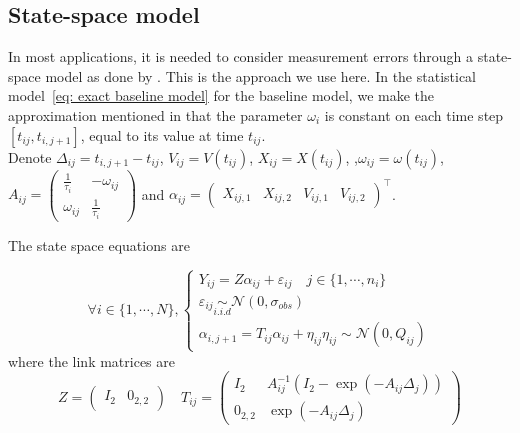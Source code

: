 \documentclass[11pt]{article}
\newcommand {\1}{\mathbb{1}}
\begin{document}
\subsection{State-space model}
\label{section: state space model}
In most applications, it is needed to consider measurement errors through a state-space model as done by \cite{johnson_continuoustime_2008}. This is the approach we use here. In the statistical model~\ref{eq: exact baseline model} for the baseline model, we make the approximation mentioned in \cite{michelot_varying-coefficient_2021} that the parameter $\omega_i$ is constant on each time step $[t_{ij},t_{i,j+1}]$, equal to its value at time $t_{ij}$.\\
 Denote $\Delta_{ij}=t_{i,j+1}-t_{ij}$, $V_{ij}=V(t_{ij})$, $X_{ij}=X(t_{ij})$, ,$\omega_{ij}=\omega(t_{ij})$, $A_{ij}=\begin{pmatrix} 
	\frac{1}{\tau_{i}} & -\omega_{ij} \\
	\omega_{ij} & \frac{1}{\tau_{i}}
\end{pmatrix}$ and $\alpha_{ij}=\begin{pmatrix} X_{ij,1}  & X_{ij,2} & V_{ij,1} & V_{ij,2}\end{pmatrix}^\top$.

The state space equations are

\begin{equation}
	\forall i \in \{1,\cdots,N\}, \left\{
	\begin{array}{l}
		Y_{ij}=Z\alpha_{ij}+\varepsilon_{ij} \quad j \in \{1,\cdots,n_i\}\\
		\varepsilon_{ij} \underset{i.i.d}{\sim} \mathcal{N}(0,\sigma_{obs}) \\
		\alpha_{i,j+1}=T_{ij} \alpha_{ij} + \eta_{ij}
		\eta_{ij} \sim \mathcal{N}(0,Q_{ij})
	\end{array}
	\right.
	\label{eq: RACVM state space}
\end{equation}
where the link matrices are 
\[Z=\begin{pmatrix} I_2 & 0_{2,2}\end{pmatrix} \quad  T_{ij}=\begin{pmatrix} I_2 & A_{ij}^{-1}(I_2-\exp(-A_{ij} \Delta_j)) \\ 0_{2,2} & \exp(-A_{ij} \Delta_j) \end{pmatrix}\]
\end{document}
